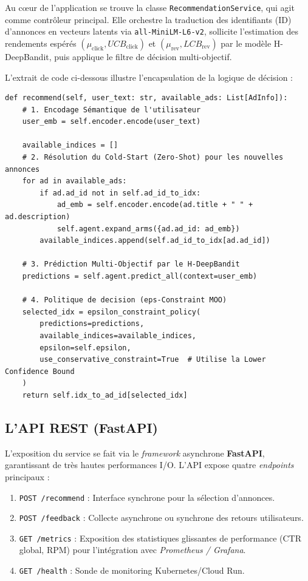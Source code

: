 Au cœur de l'application se trouve la classe \texttt{RecommendationService}, qui agit comme contrôleur principal. Elle orchestre la traduction des identifiants (ID) d'annonces en vecteurs latents via \texttt{all-MiniLM-L6-v2}, sollicite l'estimation des rendements espérés $(\mu_{\text{click}}, UCB_{\text{click}})$ et $(\mu_{\text{rev}}, LCB_{\text{rev}})$ par le modèle H-DeepBandit, puis applique le filtre de décision multi-objectif.

L'extrait de code ci-dessous illustre l'encapsulation de la logique de décision :

\begin{listing}[htbp]
\begin{verbatim}
def recommend(self, user_text: str, available_ads: List[AdInfo]):
    # 1. Encodage Sémantique de l'utilisateur
    user_emb = self.encoder.encode(user_text)
    
    available_indices = []
    # 2. Résolution du Cold-Start (Zero-Shot) pour les nouvelles annonces
    for ad in available_ads:
        if ad.ad_id not in self.ad_id_to_idx:
            ad_emb = self.encoder.encode(ad.title + " " + ad.description)
            self.agent.expand_arms({ad.ad_id: ad_emb})
        available_indices.append(self.ad_id_to_idx[ad.ad_id])
        
    # 3. Prédiction Multi-Objectif par le H-DeepBandit
    predictions = self.agent.predict_all(context=user_emb)
    
    # 4. Politique de decision (eps-Constraint MOO)
    selected_idx = epsilon_constraint_policy(
        predictions=predictions,
        available_indices=available_indices,
        epsilon=self.epsilon,
        use_conservative_constraint=True  # Utilise la Lower Confidence Bound
    )
    return self.idx_to_ad_id[selected_idx]
\end{verbatim}
\caption{Extrait de la méthode de recommandation principale (\texttt{RecommendationService}).}
\label{lst:recommend_method}
\end{listing}

\subsection{L'API REST (FastAPI)}

L'exposition du service se fait via le \textit{framework} asynchrone \textbf{FastAPI}, garantissant de très hautes performances I/O. L'API expose quatre \textit{endpoints} principaux :
\begin{enumerate}
    \item \texttt{POST /recommend} : Interface synchrone pour la sélection d'annonces.
    \item \texttt{POST /feedback} : Collecte asynchrone ou synchrone des retours utilisateurs.
    \item \texttt{GET /metrics} : Exposition des statistiques glissantes de performance (CTR global, RPM) pour l'intégration avec \textit{Prometheus / Grafana}.
    \item \texttt{GET /health} : Sonde de monitoring Kubernetes/Cloud Run.
\end{enumerate}

